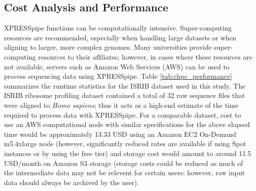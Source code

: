 \documentclass[10pt, oneside]{article}
\begin{document}
\subsection*{Cost Analysis and Performance}
XPRESSpipe functions can be computationally intensive. Super-computing resources are recommended, especially when handling large datasets or when aligning to larger, more complex genomes. Many universities provide super-computing resources to their affiliates; however, in cases where these resources are not available, servers such as Amazon Web Services (AWS) \cite{aws} can be used to process sequencing data using XPRESSpipe. Table \ref{tab:chpc_performance} summarizes the runtime statistics for the ISRIB dataset used in this study. The ISRIB ribosome profiling dataset contained a total of 32 raw sequence files that were aligned to \textit{Homo sapiens}; thus it acts as a high-end estimate of the time required to process data with XPRESSpipe. For a comparable dataset, cost to use an AWS computational node with similar specifications for the above elapsed time would be approximately 13.33 USD using an Amazon EC2 On-Demand m5.4xlarge node (however, significantly reduced rates are available if using Spot instances or by using the free tier) and storage cost would amount to around 11.5 USD/month on Amazon S3 storage (storage costs could be reduced as much of the intermediate data may not be relevent for certain users; however, raw input data should always be archived by the user). \\
\end{document}

